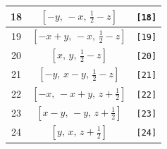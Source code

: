 \documentclass[fleqn,8pt]{jsarticle}
\begin{document}
\begin{longtable}{ccc}
18 & $\left[ - y,\, - x,\, \frac{1}{2} - z \right]$ & {\tt [18]} \\ \hline
19 & $\left[ - x + y,\, - x,\, \frac{1}{2} - z \right]$ & {\tt [19]} \\ \hline
20 & $\left[ x,\, y,\, \frac{1}{2} - z \right]$ & {\tt [20]} \\ \hline
21 & $\left[ - y,\, x - y,\, \frac{1}{2} - z \right]$ & {\tt [21]} \\ \hline
22 & $\left[ - x,\, - x + y,\, z + \frac{1}{2} \right]$ & {\tt [22]} \\ \hline
23 & $\left[ x - y,\, - y,\, z + \frac{1}{2} \right]$ & {\tt [23]} \\ \hline
24 & $\left[ y,\, x,\, z + \frac{1}{2} \right]$ & {\tt [24]} \\
\end{longtable}
\end{document}
